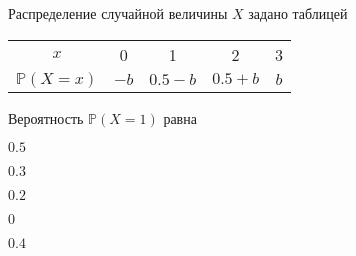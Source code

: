 
\begin{question}
Распределение случайной величины \(X\) задано таблицей

\begin{center}
\begin{tabular}{ccccc}
\toprule
$x$ & 0 & 1 & 2 & 3 \\ 
$\mathbb{P}(X=x)$ & $-b$ & $0.5-b$ & $0.5+b$ & $b$ \\
\bottomrule
\end{tabular}
\end{center}

Вероятность \(\mathbb{P}(X=1)\) равна
\begin{answerlist}
  \item \(0.5\)
  \item \(0.3\)
  \item \(0.2\)
  \item \(0\)
  \item \(0.4\)
\end{answerlist}
\end{question}


